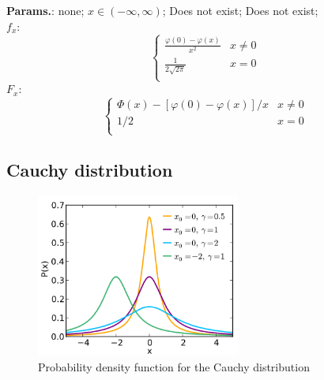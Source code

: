     {\color{darkblue} \textbf{Params.}:} {none}; {$x\in(-\infty,\infty)$}; {Does not exist}; {Does not exist};\hspace{0.5cm}\\{\color{darkblue} \textbf{$f_x$}:} {$$\begin{cases}
\frac{\varphi(0) - \varphi(x)}{x^2} &  x \ne 0 \\
\frac{1}{2\sqrt{2\pi}} & x = 0 \\
\end{cases}$$}{\color{darkblue} \textbf{$F_x$}:} {$$\begin{cases}
\Phi(x) - \left[ \varphi(0) - \varphi(x) \right] / x &  x \ne 0 \\
1 / 2 & x = 0 \\
\end{cases}$$}



    
        
\subsection{Cauchy distribution}


    \begin{figure}[H]
        \centering
        \includegraphics[width=0.6\textwidth]{images/cauchy pdf.png}
        \caption{Probability density function for the Cauchy distribution}
    \end{figure}




